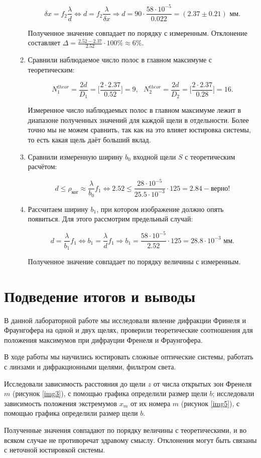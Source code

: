 \documentclass[a4paper,12pt]{article} %
\begin{document}
\begin{enumerate}
\begin{enumerate}
        \[ \delta x=f_2\frac{\lambda}{d} \Leftrightarrow d=f_2\frac{\lambda}{\delta x} \Longrightarrow d=90\cdot\frac{58\cdot10^{-5}}{0.022}=(2.37\pm0.21)\text{ мм}. \]

        Полученное значение совпадает по порядку с измеренным. Отклонение составляет $\Delta = \frac{2.52-2.37}{2.52}\cdot100\%\approx6\%.$
        \item Сравнили наблюдаемое число полос в главном максимуме с теоретическим:

        \[ N^{theor}_1 = \frac{2d}{D_1} = \Bigg[\frac{2\cdot2.37}{0.52}\Bigg] = 9,\text{ } N^{theor}_2 = \frac{2d}{D_2} = \Bigg[\frac{2\cdot2.37}{0.28}\Bigg] = 16. \]

        Измеренное число наблюдаемых полос в главном максимуме лежит в диапазоне полученных значений для каждой щели в отдельности. Более точно мы не можем сравнить, так как на это влияет юстировка системы, то есть какая щель даёт больший вклад.

        \item Сравнили измеренную ширину $b_0$ входной щели $S$ с теоретическим расчётом:

        \[ d \leq\rho_{\text{ког}} \approx \frac{\lambda}{b_0}f_1 \Longleftrightarrow 2.52\leq\frac{28\cdot10^{-5}}{25.5\cdot10^{-3}}\cdot125=2.84 - \text{верно!} \]

        \item Рассчитаем ширину $b_1$, при котором изображение должно опять появиться. Для этого рассмотрим предельный случай:

        \[ d =\frac{\lambda}{b_1}f_1 \Longleftrightarrow b_1=\frac{\lambda}{d}f_1 \Longrightarrow b_1=\frac{58\cdot10^{-5}}{2.52}\cdot125=28.8\cdot10^{-3}\text{ мм.} \]

        Полученное значение совпадает по порядку величины с измеренным.
        
    \end{enumerate}
\end{enumerate}

\section{Подведение итогов и выводы}

В данной лабораторной работе мы исследовали явление дифракции Фринеля и Фраунгофера на одной и двух щелях, проверили теоретические соотношения для положения максимумов при дифрауции Френеля и Фраунгофера.

В ходе работы мы научились юстировать сложные оптические системы, работать с линзами и дифракционными щелями, фильтром света.

Исследовали зависимость расстояния до щели $z$ от числа открытых зон Френеля $m$ (рисунок \ref{img3}), с помощью графика определили размер щели $b$; исследовали зависимость положения экстремумов $x_m$ от их номера $m$ (рисунок \ref{img5}), с помощью графика определили размер щели $b$.

Полученные значения совпадают по порядку величины с теоретическими, и во всяком случае не противоречат здравому смыслу. Отклонения могут быть связаны с неточной юстировкой системы.
\end{document}
